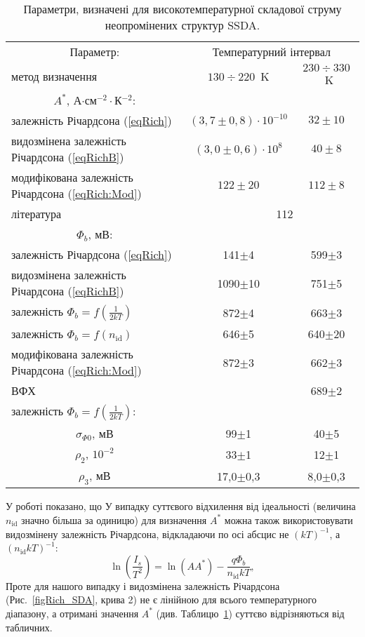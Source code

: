 \begin{table}
\caption{\label{tabPar:SSDA}Параметри, визначені для високотемпературної складової струму неопромінених структур SSDA.
}
\center
\begin{tabular}{|l|c|c|}
\hline
\multicolumn{1}{|c|}{Параметр:}& \multicolumn{2}{c|}{Температурний інтервал}\\ \cline{2-3}
метод визначення&$130\div220$~K&$230\div330$~K\\
\hline
\multicolumn{1}{|c|}{$A^*$, А$\cdot$см$^{-2}\cdot$К$^{-2}$:}&&\\
залежність Річардсона (\ref{eqRich})&$(3,7\pm0,8)\cdot10^{-10}$&$32\pm10$\\
видозмінена залежність Річардсона (\ref{eqRichB})&$(3,0\pm0,6)\cdot10^{8}$&$40\pm8$\\
модифікована залежність Річардсона (\ref{eqRich:Mod})&$122\pm20$&$112\pm8$\\
література  \cite{Schroder2006}& \multicolumn{2}{c|}{$\,\,\,\,\,\,\,\,\,\,\,\,$   112}\\ \hline
\multicolumn{1}{|c|}{$\Phi_b$, мВ:}&&\\
залежність Річардсона (\ref{eqRich})&141$\pm$4&599$\pm$3\\
видозмінена залежність Річардсона (\ref{eqRichB})&1090$\pm$10&751$\pm$5\\
залежність $\Phi_b=f(\frac{1}{2kT})$&872$\pm$4&663$\pm$3\\
залежність $\Phi_b=f(n_\mathrm{id})$&646$\pm$5&640$\pm$20\\
модифікована залежність Річардсона (\ref{eqRich:Mod})&872$\pm$3&662$\pm$3\\
ВФХ &&689$\pm$2\\
\hline
залежність $\Phi_b=f(\frac{1}{2kT})$:&&\\
\multicolumn{1}{|c|}{$\sigma_{\Phi0}$, мВ} &99$\pm$1&40$\pm$5\\
\multicolumn{1}{|c|}{$\rho_2$, $10^{-2}$} &33$\pm$1&12$\pm$1\\
\multicolumn{1}{|c|}{$\rho_3$, мВ }&17,0$\pm$0,3&8,0$\pm$0,3\\
\hline
\end{tabular}
\end{table}



У роботі \cite{Aldemir} показано, що
У випадку суттєвого відхилення від ідеальності (величина $n_\mathrm{id}$ значно більша за одиницю)
для визначення $A^*$ можна також використовувати \cite{Aldemir,Mohan} видозмінену залежність Річардсона,
відкладаючи по осі абсцис не $(kT)^{-1}$, а $(n_\mathrm{id} kT)^{-1}$:
\begin{equation}\label{eqRichB}
\ln\left(\frac{I_s}{T^2}\right)=\ln(AA^*)-\frac{q\Phi_b}{n_\mathrm{id}kT},
\end{equation}
Проте для нашого випадку і видозмінена залежність Річардсона (Рис.~\ref{figRich_SDA}, крива 2) не є лінійною для всього
температурного діапазону, а отримані значення $A^*$ (див. Таблицю~\ref{tabPar:SSDA}) суттєво відрізняються
від табличних.

